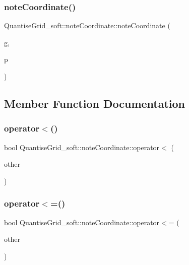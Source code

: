\subsubsection{\texorpdfstring{note\+Coordinate()}{noteCoordinate()}}
{\footnotesize\ttfamily Quantise\+Grid\+\_\+soft\+::note\+Coordinate\+::note\+Coordinate (\begin{DoxyParamCaption}\item[{uint64\+\_\+t}]{g,  }\item[{float}]{p }\end{DoxyParamCaption})}



\subsection{Member Function Documentation}
\mbox{\label{structQuantiseGrid__soft_1_1noteCoordinate_ac3edd1bb18b7294d6601f4f39d8fe913}} 
\subsubsection{\texorpdfstring{operator$<$()}{operator<()}}
{\footnotesize\ttfamily bool Quantise\+Grid\+\_\+soft\+::note\+Coordinate\+::operator$<$ (\begin{DoxyParamCaption}\item[{const \mbox{\hyperlink{structQuantiseGrid__soft_1_1noteCoordinate}{note\+Coordinate}} \&}]{other }\end{DoxyParamCaption})}

\mbox{\label{structQuantiseGrid__soft_1_1noteCoordinate_a92b1eedbffb4215add5e127c18e8de24}} 
\subsubsection{\texorpdfstring{operator$<$=()}{operator<=()}}
{\footnotesize\ttfamily bool Quantise\+Grid\+\_\+soft\+::note\+Coordinate\+::operator$<$= (\begin{DoxyParamCaption}\item[{const \mbox{\hyperlink{structQuantiseGrid__soft_1_1noteCoordinate}{note\+Coordinate}} \&}]{other }\end{DoxyParamCaption})}



